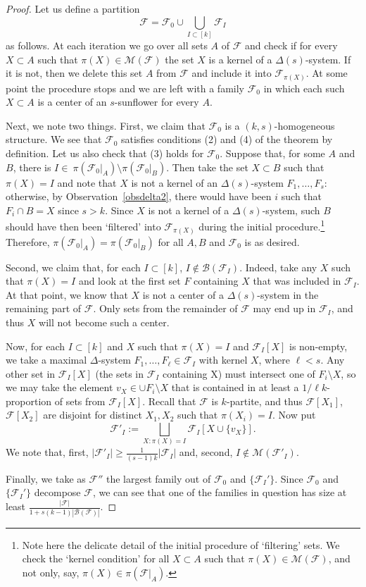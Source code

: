 \documentclass[graybox]{svmult}
\renewcommand{\ge}{\geqslant}
\newcommand{\ff}{\mathcal{F}}
\newcommand{\m}{\mathcal}
\begin{document}
    \begin{proof}
      Let us define a partition
      $$\ff = \ff_0\cup \bigcup_{I\subset [k]}\ff_I$$
      as follows. At each iteration we go over all sets $A$ of $\ff$ and check if for every $X\subset A$ such that $\pi(X)\in \m M(\ff)$ the set $X$ is a kernel of a $\Delta(s)$-system. If it is not, then we delete this set $A$ from $\ff$ and include it into $\ff_{\pi(X)}$. At some point the procedure stops and we are left with a family $\ff_0$ in which each such $X\subset A$ is a center of an $s$-sunflower for every $A$.

      Next, we note two things. First, we claim that $\ff_0$ is a $(k,s)$-homogeneous structure. We see that $\ff_0$ satisfies conditions (2) and (4) of the theorem by definition. Let us also check that (3) holds for $\ff_0$. Suppose that, for some $A$ and $B$, there is $I\in \ \pi(\ff_0|_A)\setminus \pi(\ff_0|_B)$. Then take the set $X\subset B$ such that $\pi(X)=I$ and note that $X$ is not a kernel of an $\Delta(s)$-system $F_1,\ldots, F_s$: otherwise, by Observation~\ref{obsdelta2}, there would have been $i$ such that $F_i\cap B = X$ since $s>k$. Since $X$ is not a kernel of a $\Delta(s)$-system, such $B$ should have then been `filtered' into $\ff_{\pi(X)}$ during the initial procedure.\footnote{Note here the delicate detail of the initial procedure of `filtering' sets. We check the `kernel condition' for all $X\subset A$ such that $\pi(X)\in \m M(\ff)$, and not only, say, $\pi(X)\in \pi(\ff|_A)$.}  Therefore, $\pi(\ff_0|_A)= \pi(\ff_0|_B)$ for all $A,B$ and $\ff_0$ is as desired.


       Second, we claim that, for each $I\subset [k]$, $I\notin \m B(\ff_{I})$. Indeed, take any $X$ such that $\pi(X) = I$ and look at the first set $F$ containing $X$ that was included in $\ff_I$. At that point, we know that $X$ is not a center of a $\Delta(s)$-system in the remaining part of $\ff$. Only sets from the remainder of $\ff$ may end up in $\ff_I$, and thus $X$ will not become such a center.

       Now, for each $I\subset [k]$ and $X$ such that $\pi(X) = I$ and $\ff_I[X]$ is non-empty, we take a maximal $\Delta$-system $F_1,\ldots, F_\ell\in \ff_I$ with kernel $X$, where $\ell<s$. Any other set in $\ff_I[X]$ (the sets in $\ff_I$ containing X) must intersect one of $F_i\setminus X$, so we may take the element $v_X\in \cup F_i\setminus X$ that is contained in at least a $1/\ell k$-proportion of sets from $\ff_I[X]$. Recall that $\ff$ is $k$-partite, and thus $\ff[X_1]$, $\ff[X_2]$ are disjoint for distinct $X_1,X_2$ such that $\pi(X_i) = I$. Now put $$\ff'_I:=\bigsqcup_{X: \pi(X)=I} \ff_I[X\cup \{v_X\}].$$ We note that, first, $|\ff'_I|\ge \frac 1{(s-1)k}|\ff_I|$ and, second, $I\notin \m M(\ff'_I)$.



      Finally, we take as $\ff''$ the largest family out of  $\ff_0$ and $\{\ff_{I}'\}$. Since $\ff_0$ and $\{\ff_{I}'\}$ decompose $\ff$, we can see that one of the families in question has size at least $\frac{|\ff|}{1+s(k-1)|\m B(\ff)|}$.
    \end{proof}
\end{document}
